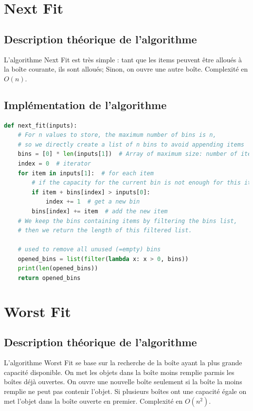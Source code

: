 \documentclass{article}
\begin{document}
\section{Next Fit}

\subsection{Description théorique de l'algorithme}
L'algorithme Next Fit est très simple : tant que les items peuvent être alloués à la boîte courante, ils sont alloués; Sinon, on ouvre une autre boîte.
Complexité en $O(n)$.

\subsection{Implémentation de l'algorithme}
\begin{lstlisting}[language=Python, frame=single]
def next_fit(inputs):
    # For n values to store, the maximum number of bins is n,
    # so we directly create a list of n bins to avoid appending items
    bins = [0] * len(inputs[1])  # Array of maximum size: number of items
    index = 0  # iterator
    for item in inputs[1]:  # for each item
        # if the capacity for the current bin is not enough for this item
        if item + bins[index] > inputs[0]:
            index += 1  # get a new bin
        bins[index] += item  # add the new item
    # We keep the bins containing items by filtering the bins list,
    # then we return the length of this filtered list.

    # used to remove all unused (=empty) bins
    opened_bins = list(filter(lambda x: x > 0, bins))
    print(len(opened_bins))
    return opened_bins
\end{lstlisting}



\section{Worst Fit}

\subsection{Description théorique de l'algorithme}
L'algorithme Worst Fit se base sur la recherche de la boîte ayant la plus grande capacité disponible.
On met les objets dans la boîte moins remplie parmis les boîtes déjà ouvertes.
On ouvre une nouvelle boîte seulement si la boîte la moins remplie ne peut pas contenir l'objet.
Si plusieurs boîtes ont une capacité égale on met l'objet dans la boîte ouverte en premier.
Complexité en $O(n^2)$.
\end{document}
